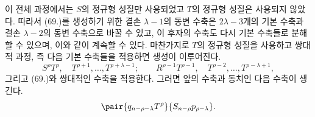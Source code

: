 이 전체 과정에서는 $S$의 정규형 성질만 사용되었고 $T$의 정규형 성질은 사용되지 않았다. 따라서 (69.)를 생성하기 위한 결손 $\lambda-1$의 동변 수축은 $2\lambda-3$개의 기본 수축과 결손 $\lambda-2$의 동변 수축으로 바꿀 수 있고, 이 후자의 수축도 다시 기본 수축들로 분해할 수 있으며, 이와 같이 계속할 수 있다. 마찬가지로 $T$의 정규형 성질을 사용하고 쌍대적 과정, 즉 다음 기본 수축들을 적용하면 생성이 이루어진다.
\[
 S^\rho T^\rho,\quad T^{\rho+1},\ldots,T^{\rho+\lambda-1};
 \qquad R^{\rho-1}T^{\rho-1},\quad T^{\rho-2},\ldots,T^{\rho-\lambda+1},
\]
그리고 (69.)와 쌍대적인 수축을 적용한다. 그러면 앞의 수축과 동치인 다음 수축이 생긴다.
\[
 \pair{q_{n-\rho-\lambda}T^\rho}{S_{n-\rho}p_{\rho-\lambda}}.
\]
